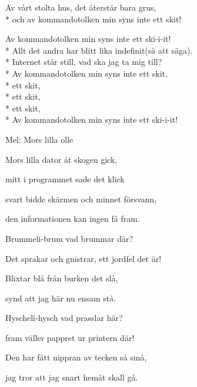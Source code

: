 \begin{SongText}[Kommandotolken]
\begin{SongVerse}
        Av vårt stolta hus, det återstår bara grus,\\*%
        och av kommandotolken min syns inte ett skit!
    \end{SongVerse}
    \begin{SongVerse}
        Av kommandotolken min syns inte ett ski-i-it!\\*%
        Allt det andra har blitt lika indefinit(så att säga).\\*%
        Internet står still, vad ska jag ta mig till?\\*%
        Av kommandotolken min syns inte ett skit,\\*%
        ett skit,\\*%
        ett skit,\\*%
        ett skit,\\*%
        Av kommandotolken min syns inte ett ski-i-it!
    \end{SongVerse}
\end{SongText}

\begin{SongText}
    \begin{SongInfo}
        Mel: Mors lilla olle
    \end{SongInfo}
    \begin{SongVerse}
        Mors lilla dator åt skogen gick,

        mitt i programmet sade det klick

        svart bidde skärmen och minnet försvann,

        den informationen kan ingen få fram.
    \end{SongVerse}
    \begin{SongVerse}
        Brummeli-brum vad brummar där?

        Det sprakar och gnistrar, ett jordfel det är!

        Blixtar blå från burken det slå,

        synd att jag här nu ensam stå.
    \end{SongVerse}
    \begin{SongVerse}
        Hyscheli-hysch vad prasslar här?

        fram väller pappret ur printern där!

        Den har fått nippran av tecken så små,

        jag tror att jag snart hemåt skall gå.
    \end{SongVerse}
\end{SongText}
\newpage